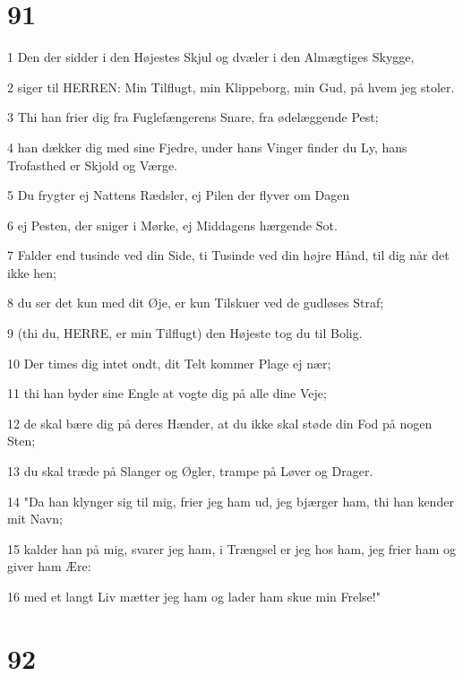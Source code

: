 \chapter{91}

\par 1 Den der sidder i den Højestes Skjul og dvæler i den Almægtiges Skygge,
\par 2 siger til HERREN: Min Tilflugt, min Klippeborg, min Gud, på hvem jeg stoler.
\par 3 Thi han frier dig fra Fuglefængerens Snare, fra ødelæggende Pest;
\par 4 han dækker dig med sine Fjedre, under hans Vinger finder du Ly, hans Trofasthed er Skjold og Værge.
\par 5 Du frygter ej Nattens Rædsler, ej Pilen der flyver om Dagen
\par 6 ej Pesten, der sniger i Mørke, ej Middagens hærgende Sot.
\par 7 Falder end tusinde ved din Side, ti Tusinde ved din højre Hånd, til dig når det ikke hen;
\par 8 du ser det kun med dit Øje, er kun Tilskuer ved de gudløses Straf;
\par 9 (thi du, HERRE, er min Tilflugt) den Højeste tog du til Bolig.
\par 10 Der times dig intet ondt, dit Telt kommer Plage ej nær;
\par 11 thi han byder sine Engle at vogte dig på alle dine Veje;
\par 12 de skal bære dig på deres Hænder, at du ikke skal støde din Fod på nogen Sten;
\par 13 du skal træde på Slanger og Øgler, trampe på Løver og Drager.
\par 14 "Da han klynger sig til mig, frier jeg ham ud, jeg bjærger ham, thi han kender mit Navn;
\par 15 kalder han på mig, svarer jeg ham, i Trængsel er jeg hos ham, jeg frier ham og giver ham Ære:
\par 16 med et langt Liv mætter jeg ham og lader ham skue min Frelse!"

\chapter{92}

